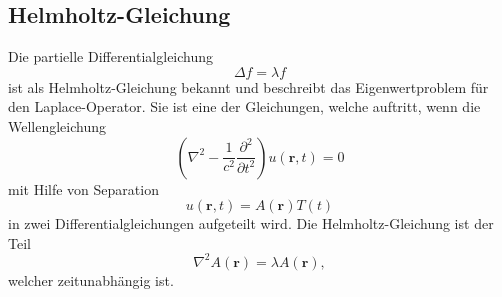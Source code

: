 \subsection{Helmholtz-Gleichung}
Die partielle Differentialgleichung 
\begin{equation}
	\Delta f = \lambda f
\end{equation}
ist als Helmholtz-Gleichung bekannt und beschreibt das Eigenwertproblem für den Laplace-Operator. 
Sie ist eine der Gleichungen, welche auftritt, wenn die Wellengleichung
\begin{equation}
	\left ( \nabla^2 - \frac{1}{c^2}\frac{\partial^2}{\partial t^2}  \right ) u(\textbf{r},t)
	=
	0 
\end{equation}
mit Hilfe von Separation
\begin{equation}
	u(\textbf{r},t) = A(\textbf{r})T(t)
\end{equation} 
in zwei Differentialgleichungen aufgeteilt wird. Die Helmholtz-Gleichung ist der Teil
\begin{equation}
	\nabla^2 A(\textbf{r}) = \lambda A(\textbf{r}),
\end{equation}
welcher zeitunabhängig ist.
